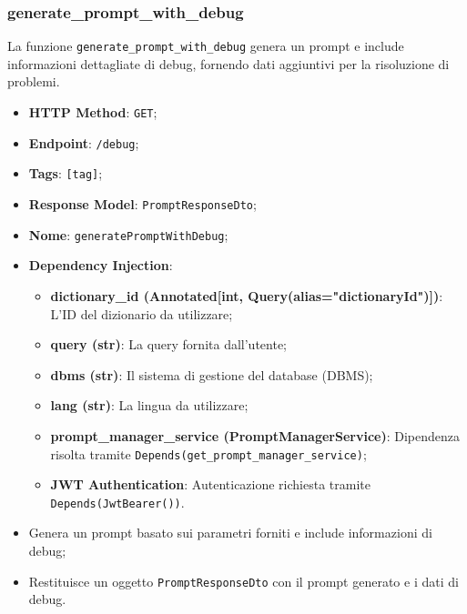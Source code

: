 \subsubsection{generate\_prompt\_with\_debug}

\par La funzione \texttt{generate\_prompt\_with\_debug} genera un prompt e include informazioni dettagliate di debug, fornendo dati aggiuntivi per la risoluzione di problemi.

\begin{itemize}
\item \textbf{HTTP Method}: \texttt{GET};
\item \textbf{Endpoint}: \texttt{/debug};
\item \textbf{Tags}: \texttt{[tag]};
\item \textbf{Response Model}: \texttt{PromptResponseDto};
\item \textbf{Nome}: \texttt{generatePromptWithDebug};
\item \textbf{Dependency Injection}:
\begin{itemize}
\item \textbf{dictionary\_id (Annotated[int, Query(alias="dictionaryId")])}: L'ID del dizionario da utilizzare;
\item \textbf{query (str)}: La query fornita dall'utente;
\item \textbf{dbms (str)}: Il sistema di gestione del database (DBMS);
\item \textbf{lang (str)}: La lingua da utilizzare;
\item \textbf{prompt\_manager\_service (PromptManagerService)}: Dipendenza risolta tramite \texttt{Depends(get\_prompt\_manager\_service)};
\item \textbf{JWT Authentication}: Autenticazione richiesta tramite \texttt{Depends(JwtBearer())}.
\end{itemize}
\end{itemize}

\begin{itemize}
\item Genera un prompt basato sui parametri forniti e include informazioni di debug;
\item Restituisce un oggetto \texttt{PromptResponseDto} con il prompt generato e i dati di debug.
\end{itemize}



